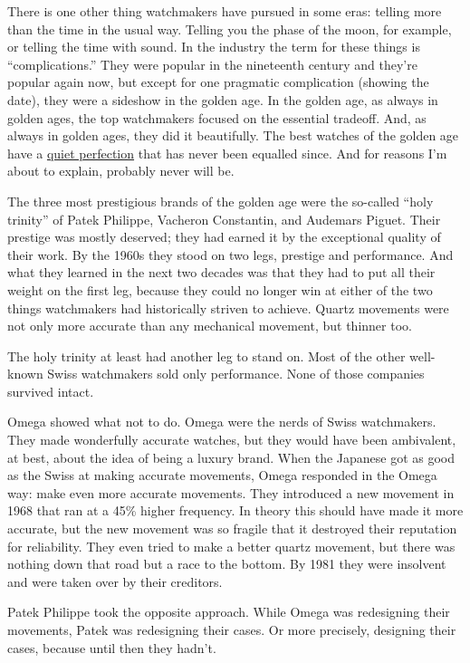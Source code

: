 \documentclass[12pt]{book}
\begin{document}
There is one other thing watchmakers have pursued in some eras: telling
more than the time in the usual way. Telling you the phase of the moon,
for example, or telling the time with sound. In the industry the term
for these things is ``complications.'' They were popular in the
nineteenth century and they're popular again now, but except for one
pragmatic complication (showing the date), they were a sideshow in the
golden age. In the golden age, as always in golden ages, the top
watchmakers focused on the essential tradeoff. And, as always in golden
ages, they did it beautifully. The best watches of the golden age have a
\href{https://goldammer.me/products/vacheron-constantin-18k-white-gold}{quiet
perfection} that has never been equalled since. And for reasons I'm
about to explain, probably never will be.

The three most prestigious brands of the golden age were the so-called
``holy trinity'' of Patek Philippe, Vacheron Constantin, and Audemars
Piguet. Their prestige was mostly deserved; they had earned it by the
exceptional quality of their work. By the 1960s they stood on two legs,
prestige and performance. And what they learned in the next two decades
was that they had to put all their weight on the first leg, because they
could no longer win at either of the two things watchmakers had
historically striven to achieve. Quartz movements were not only more
accurate than any mechanical movement, but thinner too.

The holy trinity at least had another leg to stand on. Most of the other
well-known Swiss watchmakers sold only performance. None of those
companies survived intact.

Omega showed what not to do. Omega were the nerds of Swiss watchmakers.
They made wonderfully accurate watches, but they would have been
ambivalent, at best, about the idea of being a luxury brand. When the
Japanese got as good as the Swiss at making accurate movements, Omega
responded in the Omega way: make even more accurate movements. They
introduced a new movement in 1968 that ran at a 45\% higher frequency.
In theory this should have made it more accurate, but the new movement
was so fragile that it destroyed their reputation for reliability. They
even tried to make a better quartz movement, but there was nothing down
that road but a race to the bottom. By 1981 they were insolvent and were
taken over by their creditors.

Patek Philippe took the opposite approach. While Omega was redesigning
their movements, Patek was redesigning their cases. Or more precisely,
designing their cases, because until then they hadn't.
\end{document}
